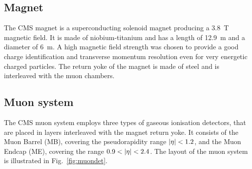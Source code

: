 \subsection{Magnet}
The CMS magnet is a superconducting solenoid magnet producing a 3.8~T magnetic 
field. It is made of niobium-titanium and has a length of 12.9~m and a diameter 
of 6~m. A high magnetic field strength was chosen to provide a good charge 
identification and transverse momentum resolution even for very energetic 
charged particles. The return yoke of the magnet is made of steel and is 
interleaved with the muon chambers.






\subsection{Muon system}
The CMS muon system employs three types of gaseous ionisation detectors, that 
are placed in layers interleaved with the magnet return yoke. It consists of 
the Muon Barrel (MB), covering the pseudorapidity range $|\eta| < 
1.2$, and the Muon Endcap (ME), covering the range $0.9 < |\eta| < 2.4$. The 
layout of the muon system is illustrated in Fig.~\ref{fig:muondet}.

